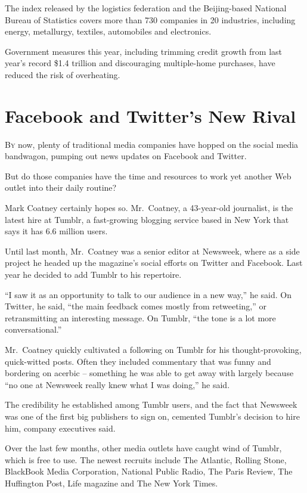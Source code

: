 ﻿\documentclass[12pt]{article}
\begin{document}
The index released by the logistics federation and the Beijing-based National Bureau of Statistics
covers more than 730 companies in 20 industries, including energy, metallurgy, textiles, automobiles
and electronics.

Government measures this year, including trimming credit growth from last year's record \$1.4
trillion and discouraging multiple-home purchases, have reduced the risk of overheating.

\section{Facebook and Twitter's New Rival}

\lettrine{B}{y} now, plenty of traditional media companies have hopped on
the social media bandwagon, pumping out news updates on Facebook and Twitter.

But do those companies have the time and resources to work yet another Web outlet into their daily
routine?

Mark Coatney certainly hopes so. Mr.~Coatney, a 43-year-old journalist, is the latest hire at
Tumblr, a fast-growing blogging service based in New York that says it has 6.6 million users.

Until last month, Mr.~Coatney was a senior editor at Newsweek, where as a side project he headed up
the magazine's social efforts on Twitter and Facebook. Last year he decided to add Tumblr to his
repertoire.

``I saw it as an opportunity to talk to our audience in a new way,'' he said. On Twitter, he said,
``the main feedback comes mostly from retweeting,'' or retransmitting an interesting message. On
Tumblr, ``the tone is a lot more conversational.''

Mr.~Coatney quickly cultivated a following on Tumblr for his thought-provoking, quick-witted posts.
Often they included commentary that was funny and bordering on acerbic -- something he was able to
get away with largely because ``no one at Newsweek really knew what I was doing,'' he said.

The credibility he established among Tumblr users, and the fact that Newsweek was one of the first
big publishers to sign on, cemented Tumblr's decision to hire him, company executives said.

Over the last few months, other media outlets have caught wind of Tumblr, which is free to use. The
newest recruits include The Atlantic, Rolling Stone, BlackBook Media Corporation, National Public
Radio, The Paris Review, The Huffington Post, Life magazine and The New York Times.
\end{document}
